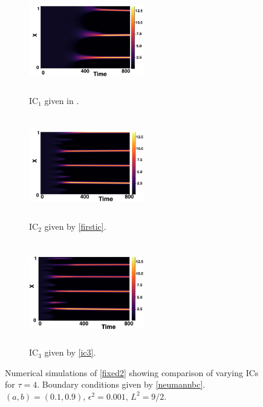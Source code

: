 \begin{figure}[H]
    \centering
    \begin{subfigure}[b]{0.32\textwidth}
        \centering
        \includegraphics[width=5cm,height=4.5cm]{gaff4.png}
        \caption{$\text{IC}_1$ given in \cite{gaffmonk}.}
        \label{}
    \end{subfigure}
    \hfill
    \begin{subfigure}[b]{0.32\textwidth}
        \centering
        \includegraphics[width=5cm,height=4.5cm]{ic24.png}
        \caption{$\text{IC}_2$ given by \eqref{firstic}.}
        \label{}
    \end{subfigure}
    \hfill
    \begin{subfigure}[b]{0.32\textwidth}
        \centering
        \includegraphics[width=5cm,height=4.5cm]{ic34.png}
        \caption{$\text{IC}_3$ given by \eqref{ic3}.}
        \label{}
    \end{subfigure}
    \caption{Numerical simulations of \eqref{fixed2} showing comparison of varying ICs for $\tau=4$. Boundary conditions given by \eqref{neumannbc}. $(a,b)=(0.1,0.9)$, $\epsilon^2=0.001$, $L^2=9/2$.}
    \label{fig:figtau4}
\end{figure}
